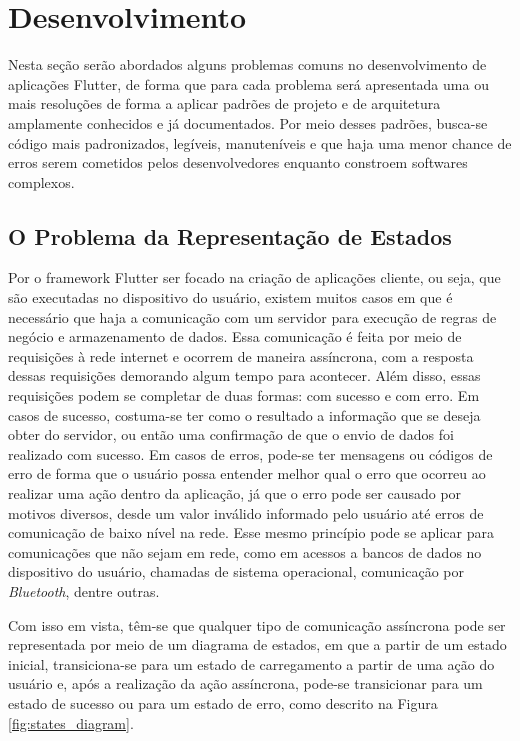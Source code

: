 \documentclass[12pt, %
openright, 
oneside, %
a4paper,    %
brazil]{facom-ufu-abntex2}
\begin{document}
\chapter{Desenvolvimento} \label{chapt:development}
Nesta seção serão abordados alguns problemas comuns no desenvolvimento de aplicações Flutter, de forma que para cada problema será apresentada uma ou mais resoluções de forma a aplicar padrões de projeto e de arquitetura amplamente conhecidos e já documentados. Por meio desses padrões, busca-se código mais padronizados, legíveis, manuteníveis e que haja uma menor chance de erros serem cometidos pelos desenvolvedores enquanto constroem softwares complexos.

\section{O Problema da Representação de Estados} \label{sec:state_representation}
Por o framework Flutter ser focado na criação de aplicações cliente, ou seja, que são executadas no dispositivo do usuário, existem muitos casos em que é necessário que haja a comunicação com um servidor para execução de regras de negócio e armazenamento de dados. Essa comunicação é feita por meio de requisições à rede internet e ocorrem de maneira assíncrona, com a resposta dessas requisições demorando algum tempo para acontecer. Além disso, essas requisições podem se completar de duas formas: com sucesso e com erro. Em casos de sucesso, costuma-se ter como o resultado a informação que se deseja obter do servidor, ou então uma confirmação de que o envio de dados foi realizado com sucesso. Em casos de erros, pode-se ter mensagens ou códigos de erro de forma que o usuário possa entender melhor qual o erro que ocorreu ao realizar uma ação dentro da aplicação, já que o erro pode ser causado por motivos diversos, desde um valor inválido informado pelo usuário até erros de comunicação de baixo nível na rede. Esse mesmo princípio pode se aplicar para comunicações que não sejam em rede, como em acessos a bancos de dados no dispositivo do usuário, chamadas de sistema operacional, comunicação por \textit{Bluetooth}, dentre outras.

Com isso em vista, têm-se que qualquer tipo de comunicação assíncrona pode ser representada por meio de um diagrama de estados, em que a partir de um estado inicial, transiciona-se para um estado de carregamento a partir de uma ação do usuário e, após a realização da ação assíncrona, pode-se transicionar para um estado de sucesso ou para um estado de erro, como descrito na Figura \ref{fig:states_diagram}.
\end{document}
